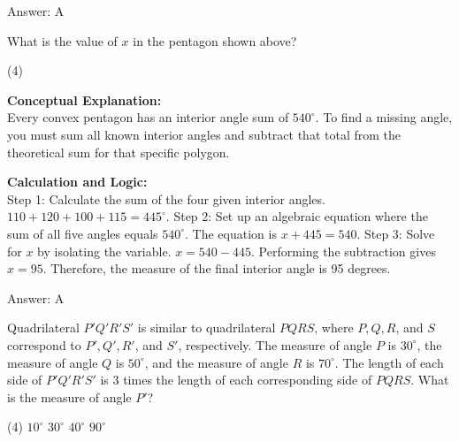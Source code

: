 \documentclass[11pt,paper=a4,answers]{exam}
\begin{document}
\begin{questions}
\begin{solution}
\vspace{30pt}

Answer: \colorbox{yellow!100}{A}
\end{solution}

\vspace{60pt}

\question
\begin{center}
\end{center}
What is the value of $x$ in the pentagon shown above?
\begin{tasks}(4)
\end{tasks}

\begin{solution}
\textbf{Conceptual Explanation:} \\
Every convex pentagon has an interior angle sum of $540^\circ$. To find a missing angle, you must sum all known interior angles and subtract that total from the theoretical sum for that specific polygon.

\vspace{30pt}

\textbf{Calculation and Logic:} \\
Step 1: Calculate the sum of the four given interior angles. $110 + 120 + 100 + 115 = 445^\circ$. Step 2: Set up an algebraic equation where the sum of all five angles equals $540^\circ$. The equation is $x + 445 = 540$. Step 3: Solve for $x$ by isolating the variable. $x = 540 - 445$. Performing the subtraction gives $x = 95$. Therefore, the measure of the final interior angle is 95 degrees.

\vspace{30pt}

Answer: \colorbox{yellow!100}{A}
\end{solution}

\vspace{60pt}

\question
Quadrilateral $P'Q'R'S'$ is similar to quadrilateral $PQRS$, where $P, Q, R$, and $S$ correspond to $P', Q', R'$, and $S'$, respectively. The measure of angle $P$ is $30^\circ$, the measure of angle $Q$ is $50^\circ$, and the measure of angle $R$ is $70^\circ$. The length of each side of $P'Q'R'S'$ is 3 times the length of each corresponding side of $PQRS$. What is the measure of angle $P'$?
\begin{tasks}(4)
    \task $10^\circ$
    \task $30^\circ$
    \task $40^\circ$
    \task $90^\circ$
\end{tasks}


\end{questions}
\end{document}
